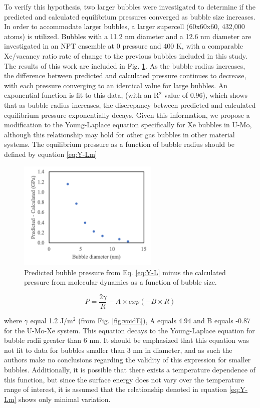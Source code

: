 \documentclass[review]{elsarticle}
\begin{document}
To verify this hypothesis, two larger bubbles were investigated to determine if the predicted and calculated equilibrium pressures converged as bubble size increases. In order to accommodate larger bubbles, a larger supercell (60x60x60, 432,000 atoms) is utilized. Bubbles with a 11.2 nm diameter and a 12.6 nm diameter are investigated in an NPT ensemble at 0 pressure and 400 K, with a comparable Xe/vacancy ratio rate of change to the previous bubbles included in this study. The results of this work are included in Fig. \ref{fig:press_diff}. As the bubble radius increases, the difference between predicted and calculated pressure continues to decrease, with each pressure converging to an identical value for large bubbles. An exponential function is fit to this data, (with an R$^2$ value of 0.96), which shows that as bubble radius increases, the discrepancy between predicted and calculated equilibrium pressure exponentially decays. Given this information, we propose a modification to the Young-Laplace equation specifically for Xe bubbles in U-Mo, although this relationship may hold for other gas bubbles in other material systems. The equilibrium pressure as a function of bubble radius should be defined by equation \ref{eq:Y-Lm}

\begin{figure}[h]
 \centering
 \includegraphics[width=0.6\textwidth]{6_press_diff.png} 
 \caption{Predicted bubble pressure from Eq. \ref{eq:Y-L} minus the calculated pressure from molecular dynamics as a function of bubble size.}
 \label{fig:press_diff}
\end{figure}

\begin{equation}
\label{eq:Y-Lm}
P = \frac{2\gamma}{R} - A \times exp(-B\times R)
\end{equation}

where $\gamma$ equal 1.2 J/m$^2$ (from Fig. \ref{fig:voidE}), A equals 4.94 and B equals -0.87 for the U-Mo-Xe system. This equation decays to the Young-Laplace equation for bubble radii greater than 6 nm. It should be emphasized that this equation was not fit to data for bubbles smaller than 3 nm in diameter, and as such the authors make no conclusions regarding the validity of this expression for smaller bubbles. Additionally, it is possible that there exists a temperature dependence of this function, but since the surface energy does not vary over the temperature range of interest, it is assumed that the relationship denoted in equation \ref{eq:Y-Lm} shows only minimal variation.
\end{document}
